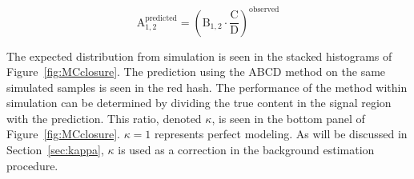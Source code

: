 \begin{equation}
\mathrm{A}_{1, 2}^{\mathrm{predicted}} = \left( \mathrm{B}_{1, 2} \cdot \frac{\mathrm{C}}{\mathrm{D}}\right)^{\mathrm{observed}}
\end{equation}

The expected \ptmiss distribution from simulation is seen in the stacked histograms of Figure~\ref{fig:MCclosure}. The prediction using the ABCD method on the same simulated samples is seen in the red hash. The performance of the method within simulation can be determined by dividing the true content in the signal region with the prediction. This ratio, denoted $\kappa$, is seen in the bottom panel of Figure~\ref{fig:MCclosure}. $\kappa=1$ represents perfect modeling. As will be discussed in Section~\ref{sec:kappa}, $\kappa$ is used as a correction in the background estimation procedure.

